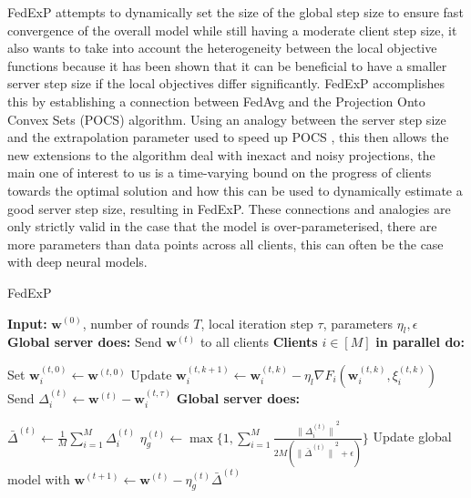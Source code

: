 \documentclass{article}
\newlength\myindent
\newcommand\bindent{%
  \begingroup
  \setlength{\itemindent}{\myindent}
  \addtolength{\algorithmicindent}{\myindent}
}
\newcommand\eindent{\endgroup}
\begin{document}
FedExP attempts to dynamically set the size of the global step size to ensure fast convergence of the overall model while still having a moderate client step size, it also wants to take into account the heterogeneity between the local objective functions because it has been shown that it can be beneficial to have a smaller server step size if the local objectives differ significantly. \cite{smallServerStepSizeForHetrogeneity}  FedExP accomplishes this by establishing a connection between FedAvg and the Projection Onto Convex Sets (POCS) algorithm.  Using an analogy between the server step size and the extrapolation parameter used to speed up POCS \cite{ExtrapolatedPOCS}, this then allows the new extensions to the algorithm deal with inexact and noisy projections, the main one of interest to us is a time-varying bound on the progress of clients towards the optimal solution and how this can be used to dynamically estimate a good server step size, resulting in FedExP.  These connections and analogies are only strictly valid in the case that the model is over-parameterised, there are more parameters than data points across all clients, this can often be the case with deep neural models.

\begin{algorithm}
\caption{FedExP}
\begin{algorithmic} 
\STATE \textbf{Input:} $\textbf{w}^{(0)}$, number of rounds $T$, local iteration step $\tau$, parameters $\eta_l, \epsilon$\\
    \STATE \textbf{Global server does:}
    \STATE Send $\textbf{w}^{(t)}$ to all clients
    \STATE \textbf{Clients} $i \in [M]$ \textbf{in parallel do:}
    \bindent
    \STATE Set $\textbf{w}_i^{(t,0)} \leftarrow \textbf{w}^{(t,0)}$    
            \STATE Update $\textbf{w}_i^{(t,k+1)} \leftarrow \textbf{w}_i^{(t,k)} - \eta_l \nabla F_i (\textbf{w}_i^{(t,k)}, \xi_i^{(t,k)})$
        \ENDFOR
        \STATE Send $\Delta_i^{(t)} \leftarrow \textbf{w}^{(t)} - \textbf{w}_i^{(t,\tau)}$
    \eindent
    \STATE \textbf{Global server does:}
    \bindent
    \STATE $\bar{\Delta}^{(t)} \leftarrow \frac{1}{M} \sum_{i=1}^{M}{\Delta_i^{(t)}}$
    \STATE $\eta_g^{(t)} \leftarrow \max\{1, \sum_{i=1}^{M}{\frac{{\lVert\Delta_i^{(t)}\rVert}^2}{2M({\lVert\bar{\Delta}^{(t)}\rVert}^{2} + \epsilon)}}\}$
    \STATE Update global model with $\textbf{w}^{(t+1)} \leftarrow \textbf{w}^{(t)} - \eta_g^{(t)}\bar{\Delta}^{(t)}$
    \eindent
\ENDFOR
\end{algorithmic}

\end{algorithm}
\end{document}
